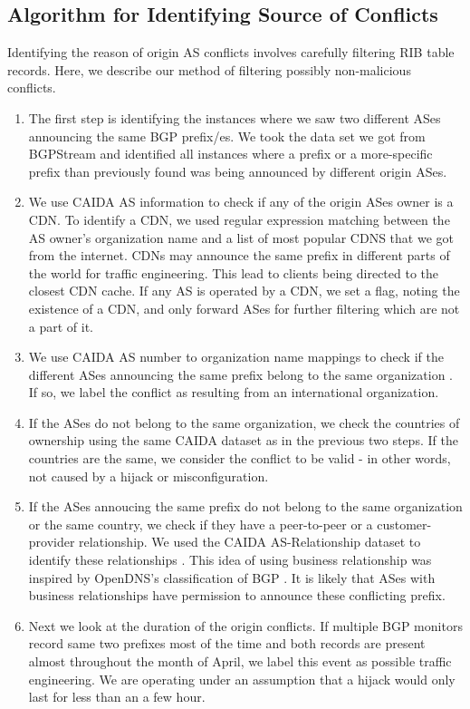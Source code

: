 \subsection{Algorithm for Identifying Source of Conflicts}
Identifying the reason of origin AS conflicts involves carefully filtering RIB table records. Here, we describe our method of filtering possibly non-malicious conflicts. 
\begin{enumerate}
\item The first step is identifying the instances where we saw two different ASes announcing the same BGP prefix/es. We took the data set we got from BGPStream and identified all instances where a prefix or a more-specific prefix than previously found was being announced by different origin ASes. 
\item We use CAIDA AS information to check if any of the origin ASes owner is a CDN\cite{mapping}. To identify a CDN, we used regular expression matching between the AS owner's organization name and a list of most popular CDNS that we got from the internet. CDNs may announce the same prefix in different parts of the world for traffic engineering. This lead to clients being directed to the closest CDN cache. If any AS is operated by a CDN, we set a flag, noting the existence of a CDN, and only forward ASes for further filtering which are not a part of it. 
\item We use CAIDA AS number to organization name mappings to check if the different ASes announcing the same prefix belong to the same organization  \cite{mapping}. If so, we label the conflict as resulting from an international organization.
\item If the ASes do not belong to the same organization, we check the countries of ownership using the same CAIDA dataset as in the previous two steps. If the countries are the same, we consider the conflict to be valid - in other words, not caused by a hijack or misconfiguration.
\item If the ASes annoucing the same prefix do not belong to the same organization or the same country, we check if they have a peer-to-peer or a customer-provider relationship. We used the CAIDA AS-Relationship dataset to identify these relationships \cite{relation}. This idea of using business relationship was inspired by OpenDNS's classification of BGP \cite{opendns_blackhat_2015}. It is likely that ASes with business relationships have permission to announce these conflicting prefix. 
\item Next we look at the duration of the origin conflicts. If multiple BGP monitors record same two prefixes most of the time and both records are present almost throughout the month of April, we label this event as possible traffic engineering. We are operating under an assumption that a hijack would only last for less than an a few hour.

\end{enumerate}
